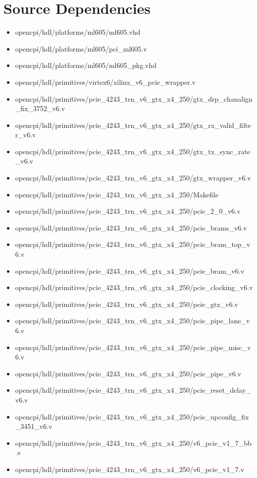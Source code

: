 \documentclass{article}
\begin{document}
\section*{Source Dependencies}
\begin{itemize}
	\item
opencpi/hdl/platforms/ml605/ml605.vhd
	\item
opencpi/hdl/platforms/ml605/pci\_ml605.v
	\item
opencpi/hdl/platforms/ml605/ml605\_pkg.vhd
	\item
opencpi/hdl/primitives/virtex6/xilinx\_v6\_pcie\_wrapper.v
	\item
opencpi/hdl/primitives/pcie\_4243\_trn\_v6\_gtx\_x4\_250/gtx\_drp\_chanalign\_fix\_3752\_v6.v
	\item
opencpi/hdl/primitives/pcie\_4243\_trn\_v6\_gtx\_x4\_250/gtx\_rx\_valid\_filter\_v6.v
	\item
opencpi/hdl/primitives/pcie\_4243\_trn\_v6\_gtx\_x4\_250/gtx\_tx\_sync\_rate\_v6.v
	\item
opencpi/hdl/primitives/pcie\_4243\_trn\_v6\_gtx\_x4\_250/gtx\_wrapper\_v6.v
	\item
opencpi/hdl/primitives/pcie\_4243\_trn\_v6\_gtx\_x4\_250/Makefile
	\item
opencpi/hdl/primitives/pcie\_4243\_trn\_v6\_gtx\_x4\_250/pcie\_2\_0\_v6.v
	\item
opencpi/hdl/primitives/pcie\_4243\_trn\_v6\_gtx\_x4\_250/pcie\_brams\_v6.v
	\item
opencpi/hdl/primitives/pcie\_4243\_trn\_v6\_gtx\_x4\_250/pcie\_bram\_top\_v6.v
	\item
opencpi/hdl/primitives/pcie\_4243\_trn\_v6\_gtx\_x4\_250/pcie\_bram\_v6.v
	\item
opencpi/hdl/primitives/pcie\_4243\_trn\_v6\_gtx\_x4\_250/pcie\_clocking\_v6.v
	\item
opencpi/hdl/primitives/pcie\_4243\_trn\_v6\_gtx\_x4\_250/pcie\_gtx\_v6.v
	\item
opencpi/hdl/primitives/pcie\_4243\_trn\_v6\_gtx\_x4\_250/pcie\_pipe\_lane\_v6.v
	\item
opencpi/hdl/primitives/pcie\_4243\_trn\_v6\_gtx\_x4\_250/pcie\_pipe\_misc\_v6.v
	\item
opencpi/hdl/primitives/pcie\_4243\_trn\_v6\_gtx\_x4\_250/pcie\_pipe\_v6.v
	\item
opencpi/hdl/primitives/pcie\_4243\_trn\_v6\_gtx\_x4\_250/pcie\_reset\_delay\_v6.v
	\item
opencpi/hdl/primitives/pcie\_4243\_trn\_v6\_gtx\_x4\_250/pcie\_upconfig\_fix\_3451\_v6.v
	\item
opencpi/hdl/primitives/pcie\_4243\_trn\_v6\_gtx\_x4\_250/v6\_pcie\_v1\_7\_bb.v
	\item
opencpi/hdl/primitives/pcie\_4243\_trn\_v6\_gtx\_x4\_250/v6\_pcie\_v1\_7.v
\end{itemize}
\end{document}
